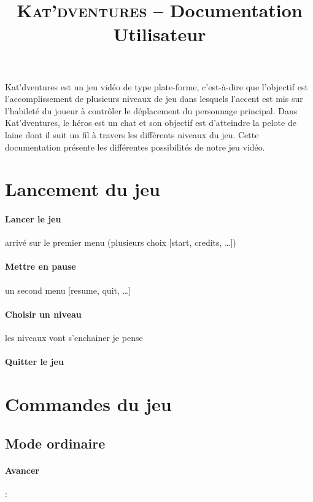 \documentclass[a4paper,11pt]{article}
\title{ \textsc{Kat'dventures} -- Documentation Utilisateur}
\date{}                    %
\begin{document}
          

\maketitle                 %
\thispagestyle{empty}      %


Kat’dventures est un jeu vidéo de type plate-forme, c’est-à-dire que l’objectif est l’accomplissement de plusieurs niveaux de jeu dans lesquels l'accent est mis sur l'habileté du joueur à contrôler le déplacement du personnage principal. Dans Kat’dventures, le héros est un chat et son objectif est d’atteindre la pelote de laine dont il suit un fil à travers les différents niveaux du jeu.
Cette documentation présente les différentes possibilités de notre jeu vidéo.

\section{Lancement du jeu}
\paragraph{Lancer le jeu} 	 arrivé sur le premier menu (plusieurs choix [start, credits, …])
\paragraph{Mettre en pause}  un second menu [resume, quit, …]
\paragraph{Choisir un niveau}  les niveaux vont s’enchainer je pense
\paragraph{Quitter le jeu} 

\section{Commandes du jeu}
\subsection{Mode ordinaire}
\paragraph{Avancer }: \fbox{$\rightarrow$}
\end{document}
